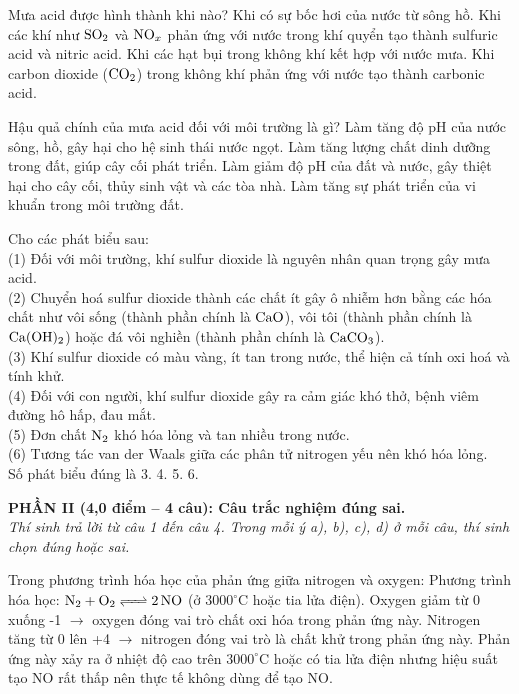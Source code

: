 \documentclass[12pt,a4paper]{article}
\begin{document}
\begin{ex}
Mưa acid được hình thành khi nào?
\choice
{Khi có sự bốc hơi của nước từ sông hồ.}
{Khi các khí như $\ce{SO2}$ và $\ce{NO_x}$ phản ứng với nước trong khí quyển tạo thành sulfuric acid và nitric acid.}
{Khi các hạt bụi trong không khí kết hợp với nước mưa.}
{Khi carbon dioxide ($\ce{CO2}$) trong không khí phản ứng với nước tạo thành carbonic acid.}
\loigiai{}
\end{ex}

\begin{ex}
Hậu quả chính của mưa acid đối với môi trường là gì?
\choice
{Làm tăng độ pH của nước sông, hồ, gây hại cho hệ sinh thái nước ngọt.}
{Làm tăng lượng chất dinh dưỡng trong đất, giúp cây cối phát triển.}
{Làm giảm độ pH của đất và nước, gây thiệt hại cho cây cối, thủy sinh vật và các tòa nhà.}
{Làm tăng sự phát triển của vi khuẩn trong môi trường đất.}
\loigiai{}
\end{ex}

\begin{ex}
Cho các phát biểu sau:\\
(1) Đối với môi trường, khí sulfur dioxide là nguyên nhân quan trọng gây mưa acid.\\
(2) Chuyển hoá sulfur dioxide thành các chất ít gây ô nhiễm hơn bằng các hóa chất như vôi sống (thành phần chính là $\ce{CaO}$), vôi tôi (thành phần chính là $\ce{Ca(OH)2}$) hoặc đá vôi nghiền (thành phần chính là $\ce{CaCO3}$).\\
(3) Khí sulfur dioxide có màu vàng, ít tan trong nước, thể hiện cả tính oxi hoá và tính khử.\\
(4) Đối với con người, khí sulfur dioxide gây ra cảm giác khó thở, bệnh viêm đường hô hấp, đau mắt.\\
(5) Đơn chất $\ce{N2}$ khó hóa lỏng và tan nhiều trong nước.\\
(6) Tương tác van der Waals giữa các phân tử nitrogen yếu nên khó hóa lỏng.\\
Số phát biểu đúng là
\choice
{3.}
{4.}
{5.}
{6.}
\loigiai{}
\end{ex}


\bigskip
\noindent
\textbf{PHẦN II (4,0 điểm -- 4 câu): Câu trắc nghiệm đúng sai.}\\
\textit{Thí sinh trả lời từ câu 1 đến câu 4. Trong mỗi ý a), b), c), d) ở mỗi câu, thí sinh chọn đúng hoặc sai.}

\begin{ex}
Trong phương trình hóa học của phản ứng giữa nitrogen và oxygen:
\choiceTF
{Phương trình hóa học: $\ce{N2 + O2 <=> 2NO}$ (ở $3000^\circ\text{C}$ hoặc tia lửa điện).}
{Oxygen giảm từ 0 xuống -1 $\rightarrow$ oxygen đóng vai trò chất oxi hóa trong phản ứng này.}
{Nitrogen tăng từ 0 lên +4 $\rightarrow$ nitrogen đóng vai trò là chất khử trong phản ứng này.}
{Phản ứng này xảy ra ở nhiệt độ cao trên $3000^\circ\text{C}$ hoặc có tia lửa điện nhưng hiệu suất tạo NO rất thấp nên thực tế không dùng để tạo NO.}
\loigiai{}
\end{ex}
\end{document}
